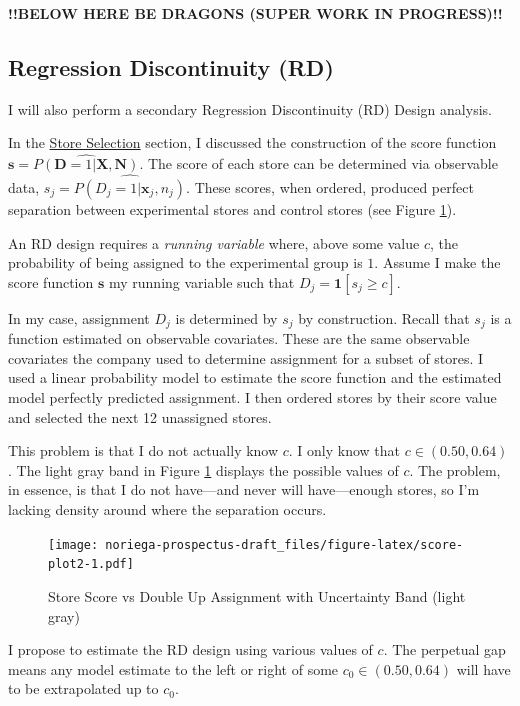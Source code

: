 \documentclass[12pt,letterpaperpaper,]{book}
\begin{document}
\textbf{!!BELOW HERE BE DRAGONS (SUPER WORK IN PROGRESS)!!}

\subsection*{Regression Discontinuity
(RD)}\label{regression-discontinuity-rd}

I will also perform a secondary Regression Discontinuity (RD) Design
analysis.

In the \protect\hyperlink{store-selection-1}{Store Selection} section, I
discussed the construction of the score function
\(\bm{s} = \widehat{P(\mathbf{D} = 1 | \bm{X}, \bm{N})}\). The score of
each store can be determined via observable data,
\(s_{j} = \widehat{P(D_{j} = 1|\bm{x}_{j}, n_{j})}\). These scores, when
ordered, produced perfect separation between experimental stores and
control stores (see Figure \ref{fig:score-plot2}).

An RD design requires a \emph{running variable} where, above some value
\(c\), the probability of being assigned to the experimental group is
\(1\). Assume I make the score function \(\bm{s}\) my running variable
such that \(D_{j} = \bm{1}[s_{j} \ge c]\).

In my case, assignment \(D_{j}\) is determined by \(s_{j}\) by
construction. Recall that \(s_{j}\) is a function estimated on
observable covariates. These are the same observable covariates the
company used to determine assignment for a subset of stores. I used a
linear probability model to estimate the score function and the
estimated model perfectly predicted assignment. I then ordered stores by
their score value and selected the next 12 unassigned stores.

This problem is that I do not actually know \(c\). I only know that
\(c \in (0.50, 0.64)\). The light gray band in Figure
\ref{fig:score-plot2} displays the possible values of \(c\). The
problem, in essence, is that I do not have---and never will
have---enough stores, so I'm lacking density around where the separation
occurs.

\begin{figure}
\centering
\texttt{[image: noriega-prospectus-draft\_files/figure-latex/score-plot2-1.pdf]}
\caption{\label{fig:score-plot2}Store Score vs Double Up Assignment with
Uncertainty Band (light gray)}
\end{figure}

I propose to estimate the RD design using various values of \(c\). The
perpetual gap means any model estimate to the left or right of some
\(c_0 \in (0.50, 0.64)\) will have to be extrapolated up to \(c_0\).
\end{document}
